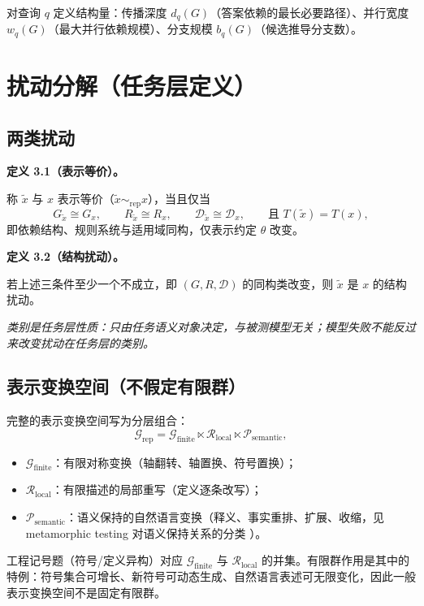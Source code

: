 \documentclass[11pt]{ctexart}
\newcommand{\named}[1]{%
  \par\vspace{6pt}\noindent\textbf{#1}\par\nopagebreak\vspace{2pt}%
}
\newcommand{\defn}[1]{\named{#1}}
\begin{document}
对查询 $q$ 定义结构量：传播深度 $d_q(G)$（答案依赖的最长必要路径）、并行宽度 $w_q(G)$（最大并行依赖规模）、分支规模 $b_q(G)$（候选推导分支数）。

\section{扰动分解（任务层定义）}

\subsection{两类扰动}

\defn{定义 3.1（表示等价）。}称 $\tilde{x}$ 与 $x$ 表示等价（$\tilde{x}\sim_{\mathrm{rep}} x$），当且仅当
\[
  G_{\tilde{x}}\cong G_x,\qquad R_{\tilde{x}}\cong R_x,\qquad \mathcal{D}_{\tilde{x}}\cong \mathcal{D}_x,\qquad \text{且 } T(\tilde{x})=T(x),
\]
即依赖结构、规则系统与适用域同构，仅表示约定 $\theta$ 改变。

\defn{定义 3.2（结构扰动）。}若上述三条件至少一个不成立，即 $(G,R,\mathcal{D})$ 的同构类改变，则 $\tilde{x}$ 是 $x$ 的结构扰动。

\textit{类别是任务层性质：只由任务语义对象决定，与被测模型无关；模型失败不能反过来改变扰动在任务层的类别。}

\subsection{表示变换空间（不假定有限群）}

完整的表示变换空间写为分层组合：
\[
  \mathcal{G}_{\mathrm{rep}}
  =
  \mathcal{G}_{\mathrm{finite}}
  \ltimes
  \mathcal{R}_{\mathrm{local}}
  \ltimes
  \mathcal{P}_{\mathrm{semantic}},
\]
\begin{itemize}
  \item $\mathcal{G}_{\mathrm{finite}}$：有限对称变换（轴翻转、轴置换、符号置换）；
  \item $\mathcal{R}_{\mathrm{local}}$：有限描述的局部重写（定义逐条改写）；
  \item $\mathcal{P}_{\mathrm{semantic}}$：语义保持的自然语言变换（释义、事实重排、扩展、收缩，见 metamorphic testing 对语义保持关系的分类 \cite{metamorphic}）。
\end{itemize}

工程记号题（符号/定义异构）对应 $\mathcal{G}_{\mathrm{finite}}$ 与 $\mathcal{R}_{\mathrm{local}}$ 的并集。有限群作用是其中的特例：符号集合可增长、新符号可动态生成、自然语言表述可无限变化，因此一般表示变换空间不是固定有限群。
\end{document}
